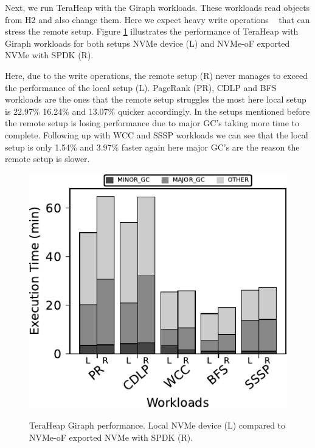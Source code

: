 Next, we run TeraHeap with the Giraph workloads. These workloads read objects
from H2 and also change them. Here we expect heavy write operations
~\cite{giraph,teraheap} that can stress the remote setup. Figure
\ref{fig:bench_giraph} illustrates the performance of TeraHeap with Giraph
workloads for both setups NVMe device (L) and NVMe-oF exported NVMe with SPDK
(R).


Here, due to the write operations, the remote setup (R) never manages to exceed the performance of the local setup (L). PageRank (PR), CDLP and BFS workloads are the ones that the remote setup struggles the most here local setup is 22.97\% 16.24\% and 13.07\% quicker accordingly. In the setups mentioned before the remote setup is losing performance due to major GC's taking more time to complete. Following up with WCC and SSSP workloads we can see that the local setup is only 1.54\%	and 3.97\% faster again here major GC's are the reason the remote setup is slower.
\begin{figure}[H]
  \includegraphics[width=\linewidth]{figures/bench_giraph.pdf}\\
\caption{TeraHeap Giraph performance. Local NVMe device (L) compared to NVMe-oF exported NVMe with SPDK (R).}
\label{fig:bench_giraph}
\end{figure}

\vspace{0.65em}
